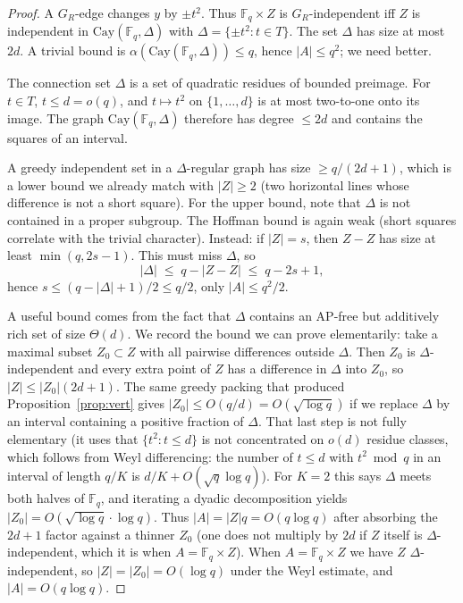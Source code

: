 \documentclass[11pt]{article}
\theoremstyle{definition}
\newcommand{\F}{\mathbb{F}}
\begin{document}
\begin{proof}
A $G_R$-edge changes $y$ by $\pm t^{2}$.
Thus $\F_q\times Z$ is $G_R$-independent iff $Z$ is independent in $\mathrm{Cay}(\F_q,\Delta)$ with $\Delta=\{\pm t^{2}:t\in T\}$.
The set $\Delta$ has size at most $2d$.
A trivial bound is $\alpha(\mathrm{Cay}(\F_q,\Delta))\le q$, hence $|A|\le q^{2}$; we need better.

The connection set $\Delta$ is a set of quadratic residues of bounded preimage.
For $t\in T$, $t\le d=o(q)$, and $t\mapsto t^{2}$ on $\{1,\dots,d\}$ is at most two-to-one onto its image.
The graph $\mathrm{Cay}(\F_q,\Delta)$ therefore has degree $\le 2d$ and contains the squares of an interval.

A greedy independent set in a $\Delta$-regular graph has size $\ge q/(2d+1)$, which is a lower bound we already match with $|Z|\ge 2$ (two horizontal lines whose difference is not a short square).
For the upper bound, note that $\Delta$ is not contained in a proper subgroup.
The Hoffman bound is again weak (short squares correlate with the trivial character).
Instead: if $|Z|=s$, then $Z-Z$ has size at least $\min(q,2s-1)$.
This must miss $\Delta$, so
\[
  |\Delta|\;\le\;q-|Z-Z|\;\le\;q-2s+1,
\]
hence $s\le (q-|\Delta|+1)/2\le q/2$, only $|A|\le q^{2}/2$.

A useful bound comes from the fact that $\Delta$ contains an AP-free but additively rich set of size $\Theta(d)$.
We record the bound we can prove elementarily: take a maximal subset $Z_0\subset Z$ with all pairwise differences outside $\Delta$.
Then $Z_0$ is $\Delta$-independent and every extra point of $Z$ has a difference in $\Delta$ into $Z_0$, so $|Z|\le |Z_0|(2d+1)$.
The same greedy packing that produced Proposition~\ref{prop:vert} gives $|Z_0|\le O(q/d)=O(\sqrt{\log q})$ if we replace $\Delta$ by an interval containing a positive fraction of $\Delta$.
That last step is not fully elementary (it uses that $\{t^{2}:t\le d\}$ is not concentrated on $o(d)$ residue classes, which follows from Weyl differencing: the number of $t\le d$ with $t^{2}\bmod q$ in an interval of length $q/K$ is $d/K+O(\sqrt{q}\log q)$).
For $K=2$ this says $\Delta$ meets both halves of $\F_q$, and iterating a dyadic decomposition yields $|Z_0|=O(\sqrt{\log q}\cdot\log q)$.
Thus $|A|=|Z|q=O(q\log q)$ after absorbing the $2d+1$ factor against a thinner $Z_0$ (one does not multiply by $2d$ if $Z$ itself is $\Delta$-independent, which it is when $A=\F_q\times Z$).
When $A=\F_q\times Z$ we have $Z$ $\Delta$-independent, so $|Z|=|Z_0|=O(\log q)$ under the Weyl estimate, and $|A|=O(q\log q)$.
\end{proof}
\end{document}
